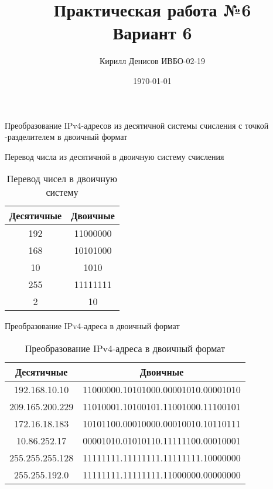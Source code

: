\documentclass[a4paper,14pt]{extarticle}
\author{Кирилл Денисов ИВБО-02-19}
\title{Практическая работа №6\\Вариант 6}
\date{\today}
\newcommand{\pathToCommonFolder}{/home/denilai/Documents/repos/latex/Common}
\newcommand{\heading}[1]{\multicolumn{1}{|c|}{#1}}
\begin{document}
	\newpage
	\newpage
\maketitle


\begin{mypart}{Преобразование IPv4-адресов из десятичной системы счисления с точкой -разделителем в двоичный формат}

	\begin{step}{Перевод числа из десятичной в двоичную систему счисления}
		\begin{table}[h!]
			\caption{Перевод чисел в двоичную систему}
			\centering
			\begin{tabular}{|c|c|}
				\hline
				\heading{\textbf{Десятичные}} &\heading{\textbf{Двоичные}}\\\hline
					192 & 11000000 \\ \hline
					168 & 10101000 \\\hline
					10 &      1010 \\\hline
					255 & 11111111 \\\hline
					2 &         10 \\\hline
			\end{tabular}
		\label{tab:ten2two}
		\end{table}
	\end{step}

	\begin{step}{Преобразование IPv4-адреса в двоичный формат}
		\begin{table}[h!]
			\caption{Преобразование IPv4-адреса в двоичный формат}
			\centering
			\begin{tabular}{|c|r|}
				\hline
				\heading{\textbf{Десятичные}} &\heading{\textbf{Двоичные}}\\\hline
				192.168.10.10   & 11000000.10101000.00001010.00001010 \\\hline
				209.165.200.229 & 11010001.10100101.11001000.11100101 \\\hline
				172.16.18.183   & 10101100.00010000.00010010.10110111 \\\hline
				10.86.252.17    & 00001010.01010110.11111100.00010001 \\\hline
				255.255.255.128 & 11111111.11111111.11111111.10000000 \\\hline
				255.255.192.0   & 11111111.11111111.11000000.00000000 \\\hline
			\end{tabular}
			\label{tab:ip-42two}
		\end{table}
	\end{step}
\end{mypart}
\end{document}
